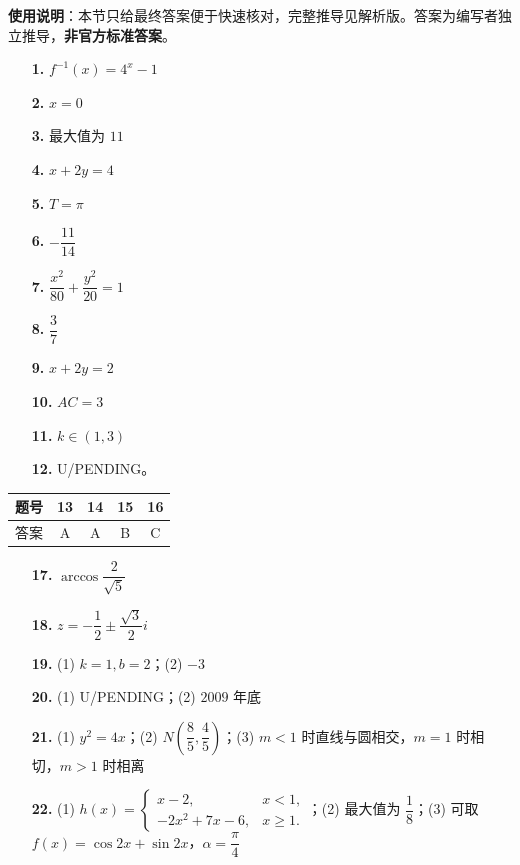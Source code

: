 
\begin{gknotice}
\textbf{使用说明}：本节只给最终答案便于快速核对，完整推导见解析版。答案为编写者独立推导，\textbf{非官方标准答案}。
\end{gknotice}

\begin{itemize}[leftmargin=2.6em]
  \item[\textbf{1.}] $f^{-1}(x)=4^x-1$
  \item[\textbf{2.}] $x=0$
  \item[\textbf{3.}] 最大值为 $11$
  \item[\textbf{4.}] $x+2y=4$
  \item[\textbf{5.}] $T=\pi$
  \item[\textbf{6.}] $-\dfrac{11}{14}$
  \item[\textbf{7.}] $\dfrac{x^2}{80}+\dfrac{y^2}{20}=1$
  \item[\textbf{8.}] $\dfrac37$
  \item[\textbf{9.}] $x+2y=2$
  \item[\textbf{10.}] $AC=3$
  \item[\textbf{11.}] $k\in(1,3)$
  \item[\textbf{12.}] U/PENDING。
\end{itemize}

\begin{center}\begin{tabular}{ccccc}
\toprule
题号 & 13 & 14 & 15 & 16 \\
\midrule
答案 & A & A & B & C \\
\bottomrule
\end{tabular}\end{center}

\begin{itemize}[leftmargin=2.6em]
  \item[\textbf{17.}] $\arccos\dfrac2{\sqrt5}$
  \item[\textbf{18.}] $z=-\dfrac12\pm\dfrac{\sqrt3}{2}i$
  \item[\textbf{19.}] (1) $k=1,b=2$；(2) $-3$
  \item[\textbf{20.}] (1) U/PENDING；(2) $2009$ 年底
  \item[\textbf{21.}] (1) $y^2=4x$；(2) $N\left(\dfrac85,\dfrac45\right)$；(3) $m<1$ 时直线与圆相交，$m=1$ 时相切，$m>1$ 时相离
  \item[\textbf{22.}] (1) $h(x)=\begin{cases}x-2,&x<1,\\-2x^2+7x-6,&x\ge1.\end{cases}$；(2) 最大值为 $\dfrac18$；(3) 可取 $f(x)=\cos2x+\sin2x$，$\alpha=\dfrac\pi4$
\end{itemize}
